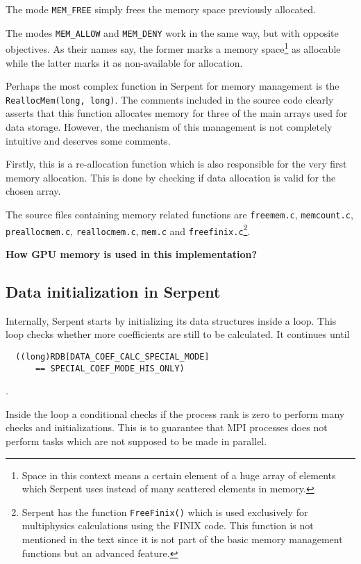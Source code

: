 \documentclass[twoside,a4paper,12pt,english,draft]{anstrans}
\begin{document}
The mode \texttt{MEM\_FREE} simply frees the memory space previously allocated.

The modes \texttt{MEM\_ALLOW} and \texttt{MEM\_DENY} work in the same way, but with opposite objectives. As
their names say, the former marks a memory space\footnote{Space in this context means a certain element of a huge array
of elements which Serpent uses instead of many scattered elements in memory.} as allocable while the latter marks it as non-available
for allocation.

Perhaps the most complex function in Serpent for memory management is the \texttt{ReallocMem(long, long)}.
The comments included in the source code clearly asserts that this function allocates memory for
three of the main arrays used for data storage. However, the mechanism of this management is not
completely intuitive and deserves some comments.

Firstly, this is a re-allocation function which is also responsible for the very first memory
allocation. This is done by checking if data allocation is valid for the chosen array.

The source files containing memory related functions are \texttt{freemem.c},
\texttt{memcount.c}, \texttt{preallocmem.c}, \texttt{reallocmem.c}, \texttt{mem.c}
and \texttt{freefinix.c}\footnote{Serpent has the function \texttt{FreeFinix()} which
  is used exclusively for multiphysics calculations using the FINIX code. This function
  is not mentioned in the text since it is not part of the basic memory management functions
  but an advanced feature.}.


\textbf{How GPU memory is used in this implementation?}

\subsection{Data initialization in Serpent}
Internally, Serpent starts by initializing its data structures inside a loop. This loop checks
whether more coefficients are still to be calculated. It continues until \begin{verbatim}
  ((long)RDB[DATA_COEF_CALC_SPECIAL_MODE]
      == SPECIAL_COEF_MODE_HIS_ONLY)
\end{verbatim}.

Inside the loop a conditional checks if the process rank is zero to perform many checks and initializations.
This is to guarantee that MPI processes does not perform tasks which are not supposed to be made in parallel.
\end{document}
